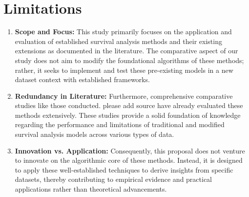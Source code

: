 \section{Limitations}
\begin{enumerate}
	\item \textbf{Scope and Focus:} This study primarily focuses on the application and evaluation of established survival analysis methods and their existing extensions as documented in the literature. The comparative aspect of our study does not aim to modify the foundational algorithms of these methods; rather, it seeks to implement and test these pre-existing models in a new dataset context with established frameworks.
	\item \textbf{Redundancy in Literature:} Furthermore, comprehensive comparative studies like those conducted. please add source have already evaluated these methods extensively. These studies provide a solid foundation of knowledge regarding the performance and limitations of traditional and modified survival analysis models across various types of data.
	\item \textbf{Innovation vs. Application:} Consequently, this proposal does not venture to innovate on the algorithmic core of these methods. Instead, it is designed to apply these well-established techniques to derive insights from specific datasets, thereby contributing to empirical evidence and practical applications rather than theoretical advancements.
\end{enumerate}








